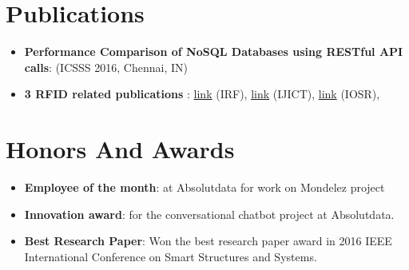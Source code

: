 \documentclass[letterpaper,11pt]{article}
\newcommand{\resumeItem}[2]{
  \item\small{
    \textbf{#1}{: #2 \vspace{-2pt}}
  }
}
\newcommand{\resumeSubItem}[2]{\resumeItem{#1}{#2}\vspace{-4pt}}
\newcommand{\resumeSubHeadingListStart}{\begin{itemize}[leftmargin=*]}
\newcommand{\resumeSubHeadingListEnd}{\end{itemize}}
\begin{document}

\section{Publications}
  \resumeSubHeadingListStart
    \resumeSubItem{Performance Comparison of NoSQL Databases using RESTful API calls}
      {(ICSSS 2016, Chennai, IN)}
    \resumeSubItem{3 RFID related publications }
      {\href{http://www.digitalxplore.org/up_proc/pdf/48-1393418802111-116.pdf}{link} (IRF), \href{hhttp://www.ripublication.com/irph/ijict_spl/ijictv4n5spl_15.pdf}{link} (IJICT), 
\href{https://www.academia.edu/7177897/D016172330}{link} (IOSR), 
}
  \resumeSubHeadingListEnd


\section{Honors And Awards}
  \resumeSubHeadingListStart
    \resumeSubItem{Employee of the month}{at Absolutdata for work on Mondelez project}
    \resumeSubItem{Innovation award}{for the conversational chatbot project at  Absolutdata.}
    \resumeSubItem{Best Research Paper}{Won the best research paper award in 2016 IEEE International Conference on Smart Structures and Systems.}
      

  \resumeSubHeadingListEnd

%
\end{document}
